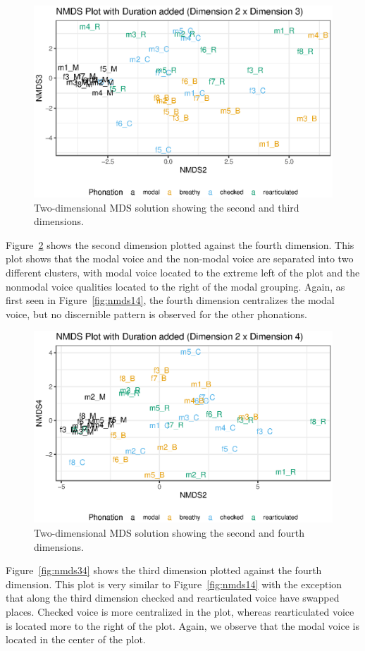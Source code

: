 \begin{figure}[h!]
    \centering
    \includegraphics[width = 0.75\linewidth]{images/MDS/nmds23_dur.eps}
    \caption{Two-dimensional MDS solution showing the second and third dimensions.}
    \label{fig:nmds23}
\end{figure}

Figure~\ref{fig:nmds24} shows the second dimension plotted against the fourth dimension. This plot shows that the modal voice and the non-modal voice are separated into two different clusters, with modal voice located to the extreme left of the plot and the nonmodal voice qualities located to the right of the modal grouping. Again, as first seen in Figure~\ref{fig:nmds14}, the fourth dimension centralizes the modal voice, but no discernible pattern is observed for the other phonations.

\begin{figure}[h!]
    \centering
    \includegraphics[width = 0.75\linewidth]{images/MDS/nmds24_dur.eps}
    \caption{Two-dimensional MDS solution showing the second and fourth dimensions.}
    \label{fig:nmds24}
\end{figure}

Figure~\ref{fig:nmds34} shows the third dimension plotted against the fourth dimension. This plot is very similar to Figure~\ref{fig:nmds14} with the exception that along the third dimension checked and rearticulated voice have swapped places. Checked voice is more centralized in the plot, whereas rearticulated voice is located more to the right of the plot. Again, we observe that the modal voice is located in the center of the plot.

